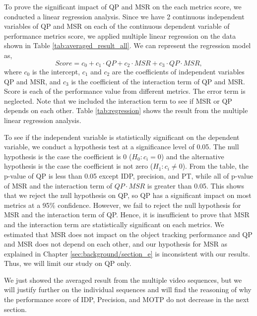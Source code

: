 To prove the significant impact of QP and MSR on the each metrics score, we conducted a linear regression analysis. Since we have 2 continuous independent variables of QP and MSR on each of the continuous dependent variable of performance metrics score, we applied multiple linear regression on the data shown in Table \ref{tab:averaged_result_all}. We can represent the regression model as,
\begin{equation}
Score = \mathit{c_0} + \mathit{c_1} \cdot QP + \mathit{c_2} \cdot MSR + \mathit{c_3} \cdot QP \cdot MSR,
\end{equation}
where $\mathit{c_0}$ is the intercept, $\mathit{c_1}$ and $\mathit{c_2}$ are the coefficients of independent variables QP and MSR, and $\mathit{c_3}$ is the coefficient of the interaction term of QP and MSR. Score is each of the performance value from different metrics. The error term is neglected. Note that we included the interaction term to see if MSR or QP depends on each other. Table \ref{tab:regression} shows the result from the multiple linear regression analysis.

To see if the independent variable is statistically significant on the dependent variable, we conduct a hypothesis test at a significance level of 0.05. The null hypothesis is the case the coefficient is 0 ($H_0: c_i = 0$) and the alternative hypothesis is the case the coefficient is not zero ($H_1: c_i \neq 0$). From the table, the p-value of QP is less than 0.05 except IDP, precision, and PT, while all of p-value of MSR and the interaction term of $QP \cdot MSR$ is greater than 0.05. This shows that we reject the null hypothesis on QP, so QP has a significant impact on most metrics at a 95\% confidence. However, we fail to reject the null hypothesis for MSR and the interaction term of QP. Hence, it is insufficient to prove that MSR and the interaction term are statistically significant on each metrics. We estimated that MSR does not impact on the object tracking performance and QP and MSR does not depend on each other, and our hypothesis for MSR as explained in Chapter \ref{sec:background/section_e} is inconsistent with our results. Thus, we will limit our study on QP only.

We just showed the averaged result from the multiple video sequences, but we will justify further on the individual sequences and will find the reasoning of why the performance score of IDP, Precision, and MOTP do not decrease in the next section.

